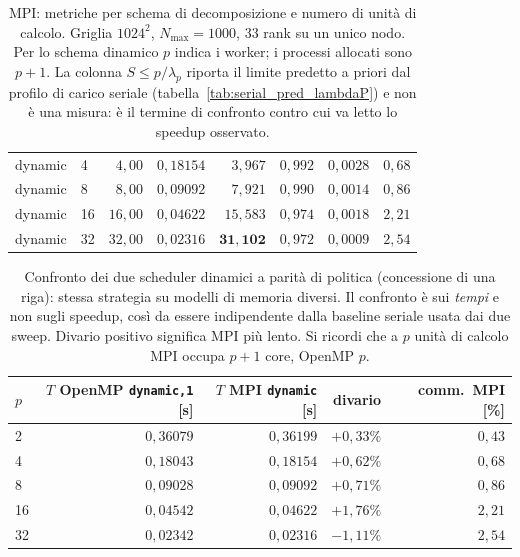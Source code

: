 \begin{table}[htbp]
\begin{tabular}{llrrrrrr}
        dynamic  & 4  & $4{,}00$  & $0{,}18154$ & $3{,}967$  & $0{,}992$ & $0{,}0028$ & $0{,}68$ \\
        dynamic  & 8  & $8{,}00$  & $0{,}09092$ & $7{,}921$  & $0{,}990$ & $0{,}0014$ & $0{,}86$ \\
        dynamic  & 16 & $16{,}00$ & $0{,}04622$ & $15{,}583$ & $0{,}974$ & $0{,}0018$ & $2{,}21$ \\
        dynamic  & 32 & $32{,}00$ & $0{,}02316$ & $\mathbf{31{,}102}$ & $0{,}972$ & $0{,}0009$ & $2{,}54$ \\
        \hline
    \end{tabular}
    \caption{MPI: metriche per schema di decomposizione e numero di unità di
    calcolo. Griglia $1024^2$, $N_{\max}=1000$, $33$ rank su un unico nodo. Per lo
    schema dinamico $p$ indica i worker; i processi allocati sono $p+1$. La colonna
        $S \le p/\lambda_p$ riporta il limite predetto a priori dal profilo di carico
        seriale (tabella~\ref{tab:serial_pred_lambdaP}) e non è una misura: è il termine
        di confronto contro cui va letto lo speedup osservato.}
    \label{tab:mpi-schemi}
\end{table}
\vspace{2,5mm}
\begin{table}[htbp]
    \centering
    \begin{tabular}{lrrrr}
        \hline
        $p$ & $T$ OpenMP \texttt{dynamic,1} [s] & $T$ MPI \texttt{dynamic} [s] &
        divario & comm.\ MPI [\%] \\
        \hline
        2  & $0{,}36079$ & $0{,}36199$ & $+0{,}33\%$ & $0{,}43$ \\
        4  & $0{,}18043$ & $0{,}18154$ & $+0{,}62\%$ & $0{,}68$ \\
        8  & $0{,}09028$ & $0{,}09092$ & $+0{,}71\%$ & $0{,}86$ \\
        16 & $0{,}04542$ & $0{,}04622$ & $+1{,}76\%$ & $2{,}21$ \\
        32 & $0{,}02342$ & $0{,}02316$ & $-1{,}11\%$ & $2{,}54$ \\
        \hline
    \end{tabular}
    \caption{Confronto dei due scheduler dinamici a parità di politica (concessione
    di una riga): stessa strategia su modelli di memoria diversi. Il confronto è sui
    \emph{tempi} e non sugli speedup, così da essere indipendente dalla baseline
    seriale usata dai due sweep. Divario positivo significa MPI più lento. Si ricordi
    che a $p$ unità di calcolo MPI occupa $p+1$ core, OpenMP $p$.}
    \label{tab:dynamic-confronto}
\end{table}

